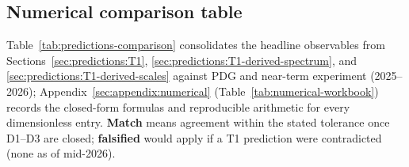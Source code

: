 \documentclass[aps,prd,onecolumn,amsmath,amssymb,nofootinbib,11pt]{revtex4-2}
\numberwithin{equation}{section}
\theoremstyle{plain}
\theoremstyle{definition}
\theoremstyle{remark}
\begin{document}
\subsection{Numerical comparison table}
\label{sec:predictions:comparison}

Table~\ref{tab:predictions-comparison} consolidates the headline observables
from Sections~\ref{sec:predictions:T1},
\ref{sec:predictions:T1-derived-spectrum}, and
\ref{sec:predictions:T1-derived-scales} against PDG and near-term experiment
(2025--2026); Appendix~\ref{sec:appendix:numerical}
(Table~\ref{tab:numerical-workbook}) records the closed-form formulas and
reproducible arithmetic for every dimensionless entry. \textbf{Match} means
agreement within the stated tolerance once D1--D3 are closed; \textbf{falsified}
would apply if a T1 prediction were contradicted (none as of mid-2026).
\end{document}
